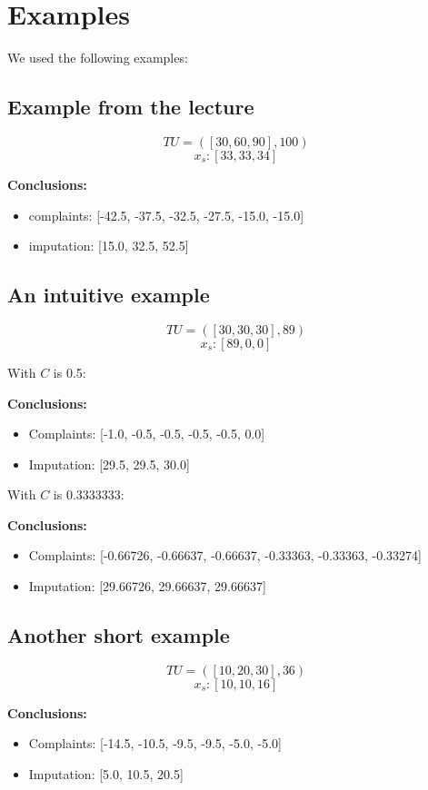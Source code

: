 \documentclass{article}
\begin{document}
\section{Examples}
We used the following examples:

\subsection{Example from the lecture}
$$TU = ([30, 60, 90], 100)$$
$$\textbf{$x_s$}: [33, 33, 34]$$

\textbf{Conclusions:}
\begin{itemize}
\item complaints: [-42.5, -37.5, -32.5, -27.5, -15.0, -15.0]
\item imputation: [15.0, 32.5, 52.5]
\end{itemize}


\subsection{An intuitive example}
$$TU = ([30, 30, 30], 89) $$
$$\textbf{$x_s$}: [89, 0, 0]$$

With $C$ is 0.5:

\textbf{Conclusions:}
\begin{itemize}
\item Complaints: [-1.0, -0.5, -0.5, -0.5, -0.5, 0.0]
\item Imputation: [29.5, 29.5, 30.0]
\end{itemize}

With $C$ is 0.3333333:

\textbf{Conclusions:}
\begin{itemize}
\item Complaints: [-0.66726, -0.66637, -0.66637, -0.33363, -0.33363, -0.33274]
\item Imputation: [29.66726, 29.66637, 29.66637]
\end{itemize}

\subsection{Another short example}
$$TU = ([10, 20, 30], 36)$$
$$\textbf{$x_s$}: [10, 10, 16]$$

\textbf{Conclusions:}
\begin{itemize}
\item Complaints: [-14.5, -10.5, -9.5, -9.5, -5.0, -5.0]
\item Imputation: [5.0, 10.5, 20.5]
\end{itemize}
\end{document}
